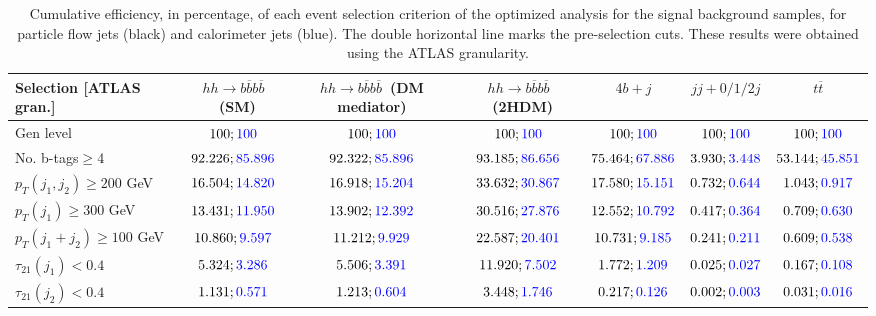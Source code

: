 \begin{landscape}
		\begin{table}
			\centering
			\caption{Cumulative efficiency, in percentage, of each event selection criterion of the optimized analysis for the signal background samples, for particle flow jets (black) and calorimeter jets (blue). The double horizontal line marks the pre-selection cuts. These results were obtained using the ATLAS granularity.}
			\begin{tabular}{lcccccc}
				\toprule 
				\textbf{Selection [ATLAS gran.]} & $hh\rightarrow b\overline{b}b\overline{b}$~(SM) & $hh\rightarrow b\overline{b}b\overline{b}$~(DM mediator) & $hh\rightarrow b\overline{b}b\overline{b}$~(2HDM) & $4b+j$  & $jj+0/1/2 j$ & $t\overline{t}$ \\
				\midrule
				Gen level & $100;\textcolor{blue}{100}$ & $100;\textcolor{blue}{100}$ &$100;\textcolor{blue}{100}$& $100;\textcolor{blue}{100}$& $100;\textcolor{blue}{100}$& $100;\textcolor{blue}{100}$ \\
				\rowcolor{black!7}No. b-tags$\geq 4$&$92.226;\textcolor{blue}{85.896}$&$92.322;\textcolor{blue}{85.896}$&$93.185;\textcolor{blue}{86.656}$&$75.464;\textcolor{blue}{67.886}$&$3.930;\textcolor{blue}{3.448}$&$53.144;\textcolor{blue}{45.851}$\\
				$p_T(j_1,j_2)\geq200$ GeV & $16.504;\textcolor{blue}{14.820}$ & $16.918;\textcolor{blue}{15.204}$&$33.632;\textcolor{blue}{30.867}$ &$17.580;\textcolor{blue}{15.151}$&$0.732;\textcolor{blue}{0.644}$&$1.043;\textcolor{blue}{0.917}$\\ 
				\midrule \midrule
				\rowcolor{black!7}$p_T(j_1)\geq 300$ GeV & $13.431;\textcolor{blue}{11.950}$ &$13.902;\textcolor{blue}{12.392}$  &$30.516;\textcolor{blue}{27.876}$&$12.552;\textcolor{blue}{10.792}$&$0.417;\textcolor{blue}{0.364}$&$0.709;\textcolor{blue}{0.630}$\\ 
				$p_T(j_1+j_2)\geq 100$ GeV &$10.860;\textcolor{blue}{9.597}$ & $11.212;\textcolor{blue}{9.929}$ &$22.587;\textcolor{blue}{20.401}$&$10.731;\textcolor{blue}{9.185}$&$0.241;\textcolor{blue}{0.211}$&$0.609;\textcolor{blue}{0.538}$\\
				\rowcolor{black!7}$\tau_{21}(j_1)<0.4$ & $5.324;\textcolor{blue}{3.286}$& $5.506;\textcolor{blue}{3.391}$&$11.920;\textcolor{blue}{7.502}$&$1.772;\textcolor{blue}{1.209}$&$0.025;\textcolor{blue}{0.027}$&$0.167;\textcolor{blue}{0.108}$\\
				$\tau_{21}(j_2)<0.4$ &$1.131;\textcolor{blue}{0.571}$ &$1.213;\textcolor{blue}{0.604}$ &$3.448;\textcolor{blue}{1.746}$&$0.217;\textcolor{blue}{0.126}$&$0.002;\textcolor{blue}{0.003}$&$0.031;\textcolor{blue}{0.016}$\\

\end{tabular}
\end{table}
\end{landscape}
